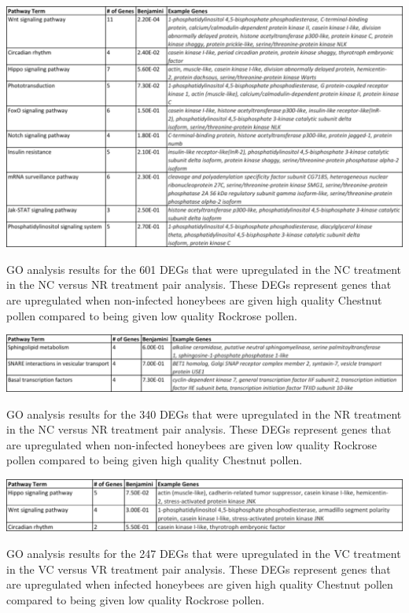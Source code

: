 \documentclass[11pt,a4paper,oldfontcommands,openany]{memoir}
\numberwithin{equation}{section} %
\begin{document}
\begin{table}[H]
  \includegraphics[width=\textwidth]{Images/NCNRNCPathways}
  \caption{GO analysis results for the 601 DEGs that were upregulated in the NC treatment in the NC versus NR treatment pair analysis. These DEGs represent genes that are upregulated when non-infected honeybees are given high quality Chestnut pollen compared to being given low quality Rockrose pollen.}
  \label{tbl:NCNRNCPathways}
\end{table}

\begin{table}[H]
  \includegraphics[width=\textwidth]{Images/NCNRNRPathways}
  \caption{GO analysis results for the 340 DEGs that were upregulated in the NR treatment in the NC versus NR treatment pair analysis. These DEGs represent genes that are upregulated when non-infected honeybees are given low quality Rockrose pollen compared to being given high quality Chestnut pollen.}
  \label{tbl:NCNRNRPathways}
\end{table}

\begin{table}[H]
  \includegraphics[width=\textwidth]{Images/VCVRVCPathways}
  \caption{GO analysis results for the 247 DEGs that were upregulated in the VC treatment in the VC versus VR treatment pair analysis. These DEGs represent genes that are upregulated when infected honeybees are given high quality Chestnut pollen compared to being given low quality Rockrose pollen.}
  \label{tbl:VCVRVCPathways}
\end{table}
\end{document}
